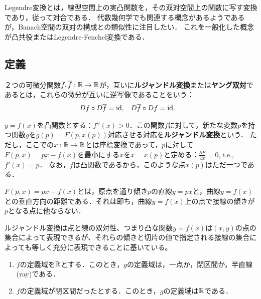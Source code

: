 \documentclass[uplatex, dvipdfmx]{jsreport}
\begin{document}
\begin{tcolorbox}[colframe=ForestGreen, colback=ForestGreen!10!white,breakable,colbacktitle=ForestGreen!40!white,coltitle=black,fonttitle=\bfseries\sffamily,
title=]
    Legendre変換とは，線型空間上の実凸関数を，その双対空間上の関数に写す変換であり，従って対合である．
    代数幾何学でも関連する概念があるようであるが，Banach空間の双対の構成との類似性に注目したい．
    これを一般化した概念が凸共役またはLegendre-Fenchel変換である．
\end{tcolorbox}

\subsection{定義}

\begin{definition}
    ２つの可微分関数$f,\overline{f}:\mathbb{R}\to\mathbb{R}$が，互いに\textbf{ルジャンドル変換}または\textbf{ヤング双対}であるとは，これらの微分が互いに逆写像であることをいう：
    \begin{align*}
        Df\circ D\overline{f}&=\mathrm{id},&D\overline{f}\circ Df&=\mathrm{id}.
    \end{align*}
\end{definition}

\begin{definition}
    $y=f(x)$を凸関数とする：$f''(x)>0$．この関数$f$に対して，新たな変数$p$を持つ関数$g$を$g(p)=F(p,x(p))$対応させる対応を\textbf{ルジャンドル変換}という．
    ただし，ここでの$x:\mathbb{R}\to\mathbb{R}$とは座標変換であって，$p$に対して$F(p,x)=px-f(x)$を最小にする$x$を$x=x(p)$と定める：$\frac{\partial F}{\partial x}=0$, i.e., $f'(x)=p$．
    なお，$f$は凸関数であるから，このような点$x(p)$はただ一つである．
\end{definition}
\begin{remark}
    $F(p,x)=px-f(x)$とは，原点を通り傾き$p$の直線$y=px$と，曲線$y=f(x)$との垂直方向の距離である．それは即ち，曲線$y=f(x)$上の点で接線の傾きが$p$となる点に他ならない．

    ルジャンドル変換は点と線の双対性、つまり凸な関数$y = f (x)$は$(x, y)$の点の集合によって表現できるが、それらの傾きと切片の値で指定される接線の集合によっても等しく充分に表現できることに基いている。
\end{remark}

\begin{proposition}\mbox{}
    \begin{enumerate}
        \item $f$の定義域を$\mathbb{R}$とする．このとき，$g$の定義域は，一点か，閉区間か，半直線(ray)である．
        \item $f$の定義域が閉区間だったとする．このとき，$g$の定義域は$\mathbb{R}$である．
    \end{enumerate}
\end{proposition}
\end{document}
